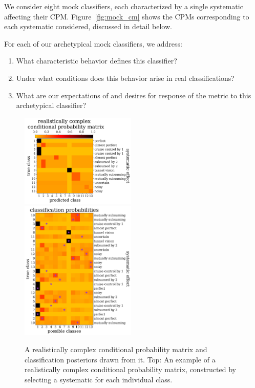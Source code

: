 We consider eight mock classifiers, each characterized by a single systematic affecting their CPM.
Figure~\ref{fig:mock_cm} shows the CPMs corresponding to each systematic considered, discussed in detail below.

For each of our archetypical mock classifiers, we address:
\begin{enumerate}
  \item What characteristic behavior defines this classifier?
  \item Under what conditions does this behavior arise in real classifications?
  \item What are our expectations of and desires for response of the metric to this archetypical classifier?
\end{enumerate}

\begin{figure}
	\begin{center}
		\includegraphics[width=0.49\textwidth]{./fig/combined.png}\\
    \includegraphics[width=0.49\textwidth]{./fig/examples.png}
		\caption{A realistically complex conditional probability matrix  and classification posteriors drawn from it.
		Top: An example of a realistically complex conditional probability matrix, constructed by selecting a systematic for each individual class.
}
\end{center}
\end{figure}
